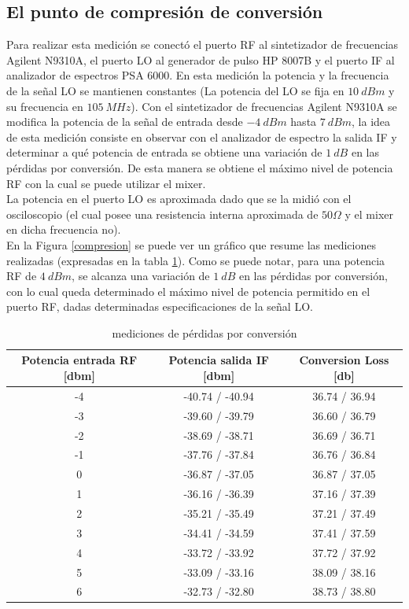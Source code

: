 \documentclass[a4paper,10pt]{article}
\begin{document}
	\subsection{El punto de compresi\'on de conversi\'on}
	\indent Para realizar esta medici\'on se conect\'o el puerto RF al 
	sintetizador de frecuencias Agilent N9310A, el puerto LO al generador de 
	pulso HP 8007B y el puerto IF al analizador de espectros PSA 6000. En esta 
	medici\'on la potencia y la frecuencia de la se\~nal LO se mantienen 
	constantes (La potencia del LO se fija en $10~dBm$ y su frecuencia en 
	$105~MHz$). Con el sintetizador de frecuencias Agilent N9310A se modifica la
	potencia de la se\~nal de entrada desde $-4~dBm$ hasta $7~dBm$, la idea de 
	esta medici\'on consiste en observar con el analizador de espectro la salida
	IF y determinar a qu\'e potencia de entrada se obtiene una variaci\'on de 
	$1~dB$ en las p\'erdidas por conversi\'on. De esta manera se obtiene el 
	m\'aximo nivel de potencia RF con la cual se puede utilizar el mixer. \\
	\indent La potencia en el puerto LO es aproximada dado que se la midió con 
	el osciloscopio (el cual posee una resistencia interna aproximada de $50 
	\Omega$  y el mixer en dicha frecuencia no). \\
	\indent En la Figura \ref{compresion} se puede ver un gr\'afico que resume 
	las mediciones realizadas (expresadas en la tabla \ref{tablaCompresion}). 
	Como se puede notar, para una potencia RF de $4~dBm$, se alcanza una 
	variaci\'on de $1~dB$ en las p\'erdidas por conversi\'on, con lo cual queda 
	determinado el m\'aximo nivel de potencia permitido en el puerto RF, dadas 
	determinadas especificaciones de la se\~nal LO.

	\begin{table}[!htp]
		\centering
		\begin{tabular}{|c|c|c|}
			\hline
			Potencia entrada RF [dbm] & Potencia salida IF [dbm] & Conversion 
			Loss [db]\\
			\hline
			-4 & -40.74 / -40.94 & 36.74 / 36.94 \\
			\hline
			-3 & -39.60 / -39.79 & 36.60 / 36.79 \\
			\hline
			-2 & -38.69 / -38.71 & 36.69 / 36.71 \\
			\hline
			-1 & -37.76 / -37.84 & 36.76 / 36.84 \\
			\hline
			0 & -36.87 / -37.05 & 36.87 / 37.05 \\
			\hline
			1 & -36.16 / -36.39 & 37.16 / 37.39 \\
			\hline
			2 & -35.21 / -35.49 & 37.21 / 37.49 \\
			\hline
			3 & -34.41 / -34.59 & 37.41 / 37.59 \\
			\hline
			4 & -33.72 / -33.92 & 37.72 / 37.92 \\
			\hline
			5 & -33.09 / -33.16 & 38.09 / 38.16 \\
			\hline
			6 & -32.73 / -32.80 & 38.73 / 38.80 \\
			\hline
		\end{tabular}
		\caption{mediciones de pérdidas por conversión}
		\label{tablaCompresion}
	\end{table}	
\end{document}
